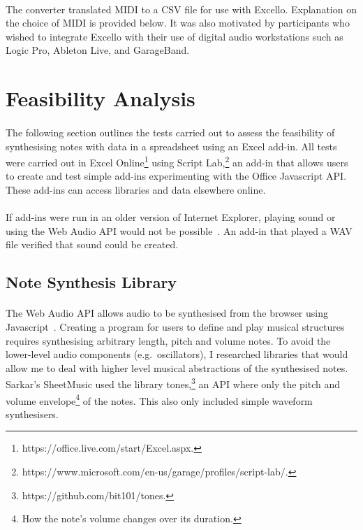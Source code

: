 \paragraph{} The converter translated MIDI to a CSV file for use with Excello. Explanation on the choice of MIDI is provided below. It was also motivated by participants who wished to integrate Excello with their use of digital audio workstations such as Logic Pro, Ableton Live, and GarageBand.

\section{Feasibility Analysis}

\paragraph{} The following section outlines the tests carried out to assess the feasibility of synthesising notes with data in a spreadsheet using an Excel add-in. All tests were carried out in Excel Online\footnote{https://office.live.com/start/Excel.aspx.} using Script Lab,\footnote{https://www.microsoft.com/en-us/garage/profiles/script-lab/.} an add-in that allows users to create and test simple add-ins experimenting with the Office Javascript API. These add-ins can access libraries and data elsewhere online.

\paragraph{} If add-ins were run in an older version of Internet Explorer, playing sound or using the Web Audio API would not be possible~\cite{mozilla:webaudioapi}. An add-in that played a WAV file verified that sound could be created.

\subsection{Note Synthesis Library}

\paragraph{} The Web Audio API allows audio to be synthesised from the browser using Javascript~\cite{mozilla:webaudioapi}. Creating a program for users to define and play musical structures requires synthesising arbitrary length, pitch and volume notes. To avoid the lower-level audio components (e.g.~oscillators), I researched libraries that would allow me to deal with higher level musical abstractions of the synthesised notes. Sarkar's SheetMusic used the library tones,\footnote{https://github.com/bit101/tones.} an API where only the pitch and volume envelope\footnote{How the note's volume changes over its duration.} of the notes. This also only included simple waveform synthesisers.

